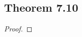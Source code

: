 \documentclass[../../main.tex]{subfiles}
\begin{document}
\subsection{Theorem 7.10}
\begin{wts}

\end{wts}
\begin{proof}

\end{proof}
\end{document}
